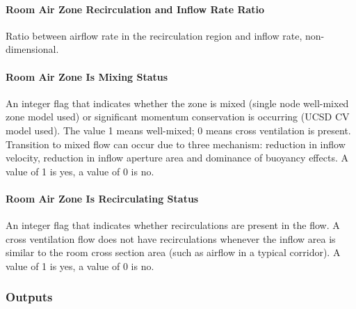 \paragraph{\texorpdfstring{Room Air Zone Recirculation and Inflow Rate Ratio \protect\hyperlink{section-1}{}}{Room Air Zone Recirculation and Inflow Rate Ratio }}\label{room-air-zone-recirculation-and-inflow-rate-ratio-1}

Ratio between airflow rate in the recirculation region and inflow rate, non-dimensional.

\paragraph{\texorpdfstring{Room Air Zone Is Mixing Status \protect\hyperlink{section-1}{}}{Room Air Zone Is Mixing Status }}\label{room-air-zone-is-mixing-status-1}

An integer flag that indicates whether the zone is mixed (single node well-mixed zone model used) or significant momentum conservation is occurring (UCSD CV model used). The value 1 means well-mixed; 0 means cross ventilation is present. Transition to mixed flow can occur due to three mechanism: reduction in inflow velocity, reduction in inflow aperture area and dominance of buoyancy effects. A value of 1 is yes, a value of 0 is no.

\paragraph{\texorpdfstring{Room Air Zone Is Recirculating Status \protect\hyperlink{section-1}{}}{Room Air Zone Is Recirculating Status }}\label{room-air-zone-is-recirculating-status-1}

An integer flag that indicates whether recirculations are present in the flow. A cross ventilation flow does not have recirculations whenever the inflow area is similar to the room cross section area (such as airflow in a typical corridor). A value of 1 is yes, a value of 0 is no.

\subsubsection{Outputs}\label{outputs-6-009}

